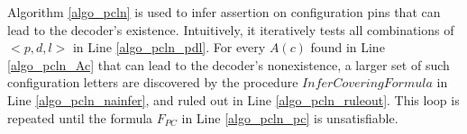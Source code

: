 \documentclass[journal]{IEEEtran}
\begin{document}
%
%
%
%

Algorithm \ref{algo_pcln} is used to infer assertion on configuration pins that can lead to the decoder's existence.
Intuitively,
it iteratively tests all combinations of $<p,d,l>$ in Line \ref{algo_pcln_pdl}.
For every $A(c)$ found in Line \ref{algo_pcln_Ac} that can lead to the decoder's nonexistence,
a larger set of such configuration letters are discovered by the procedure $InferCoveringFormula$ in Line \ref{algo_pcln_nainfer},
and ruled out in Line \ref{algo_pcln_ruleout}.
This loop is repeated until the formula $F_{PC}$ in Line \ref{algo_pcln_pc} is unsatisfiable.
\end{document}
